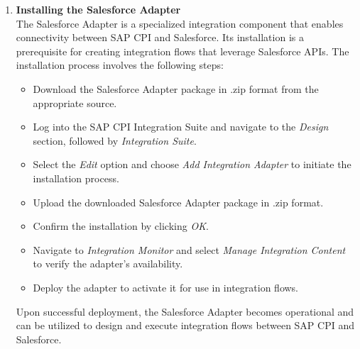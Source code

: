 \begin{enumerate}
    \item \textbf{Installing the Salesforce Adapter} \\
    The Salesforce Adapter is a specialized integration component that enables connectivity between SAP CPI and Salesforce. Its installation is a prerequisite for creating integration flows that leverage Salesforce APIs. The installation process involves the following steps:
    \begin{itemize}
        \item Download the Salesforce Adapter package in .zip format from the appropriate source.
        \item Log into the SAP CPI Integration Suite and navigate to the \textit{Design} section, followed by \textit{Integration Suite}.
        \item Select the \textit{Edit} option and choose \textit{Add Integration Adapter} to initiate the installation process.
        \item Upload the downloaded Salesforce Adapter package in .zip format.
        \item Confirm the installation by clicking \textit{OK}.
        \item Navigate to \textit{Integration Monitor} and select \textit{Manage Integration Content} to verify the adapter's availability.
        \item Deploy the adapter to activate it for use in integration flows.
    \end{itemize}
    Upon successful deployment, the Salesforce Adapter becomes operational and can be utilized to design and execute integration flows between SAP CPI and Salesforce.


\end{enumerate}
